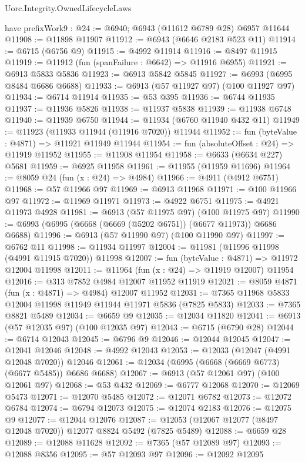 \begin{lexlean}{Uorc.Integrity.OwnedLifecycleLaws}
\begin{coremodule}
  have prefixWork9 : @24 := @6940; @6943 (@11612 @6789 @28) @6957 @11644
@11908 := @11898 @11907
@11912 := @6943 (@6646 @2183 @523 @11)
@11914 := @6715 (@6756 @9)
@11915 := @4992 @11914
@11916 := @8497 @11915
@11919 := @11912 (fun (spanFailure : @6642) => @11916 @6955)
@11921 := @6913 @5833 @5836
@11923 := @6913 @5842 @5845
@11927 := @6993 (@6995 @8484 @6686 @6688)
@11933 := @6913 (@57 @11927 @97) (@100 @11927 @97)
@11934 := @6714 @11914
@11935 := @53 @395
@11936 := @6744 @11935
@11937 := @11936 @5826
@11938 := @11937 @5838
@11939 := @11938 @6748
@11940 := @11939 @6750
@11944 := @11934 (@6760 @11940 @432 @11)
@11949 := @11923 (@11933 @11944 (@11916 @7020)) @11944
@11952 := fun (byteValue : @4871) => @11921 @11949 @11944
@11954 := fun (absoluteOffset : @24) => @11919 @11952
@11955 := @11908 @11954
@11958 := @6633 (@6634 @227) @5681
@11959 := @6925 @11958
@11961 := @11955 (@11959 @11696)
@11964 := @8059 @24 (fun (x : @24) => @4984)
@11966 := @4911 (@4912 @6751)
@11968 := @57 @11966 @97
@11969 := @6913 @11968
@11971 := @100 @11966 @97
@11972 := @11969 @11971
@11973 := @4922 @6751
@11975 := @4921 @11973 @4928
@11981 := @6913 (@57 @11975 @97) (@100 @11975 @97)
@11990 := @6993 (@6995 (@6668 (@6669 (@5202 @6751)) (@6677 @11973)) @6686 @6688)
@11996 := @6913 (@57 @11990 @97) (@100 @11990 @97)
@11997 := @6762 @11
@11998 := @11934 @11997
@12004 := @11981 (@11996 @11998 (@4991 @11915 @7020)) @11998
@12007 := fun (byteValue : @4871) => @11972 @12004 @11998
@12011 := @11964 (fun (x : @24) => @11919 @12007) @11954
@12016 := @313 @7852 @4984 @12007 @11952 @11919
@12021 := @8059 @4871 (fun (x : @4871) => @4984) @12007 @11952
@12031 := @7365 @11968 @5833 @12004 @11998 @11949 @11944 @11971 @5836 (@7825 @5833)
@12033 := @7365 @8821 @5489
@12034 := @6659 @9
@12035 := @12034 @11820
@12041 := @6913 (@57 @12035 @97) (@100 @12035 @97)
@12043 := @6715 (@6790 @28)
@12044 := @6714 @12043
@12045 := @6796 @9
@12046 := @12044 @12045
@12047 := @12041 @12046
@12048 := @4992 @12043
@12053 := @12033 (@12047 (@4991 @12048 @7020)) @12046
@12061 := @12034 (@6995 (@6668 (@6669 @6773) (@6677 @5485)) @6686 @6688)
@12067 := @6913 (@57 @12061 @97) (@100 @12061 @97)
@12068 := @53 @432
@12069 := @6777 @12068
@12070 := @12069 @5473
@12071 := @12070 @5485
@12072 := @12071 @6782
@12073 := @12072 @6784
@12074 := @6794 @12073
@12075 := @12074 @2183
@12076 := @12075 @9
@12077 := @12044 @12076
@12087 := @12053 (@12067 @12077 (@8497 @12048 @7020)) @12077 @8824 @5492 (@7825 @5489)
@12088 := @6659 @28
@12089 := @12088 @11628
@12092 := @7365 (@57 @12089 @97)
@12093 := @12088 @8356
@12095 := @57 @12093 @97
@12096 := @12092 @12095

\end{coremodule}
\end{lexlean}
